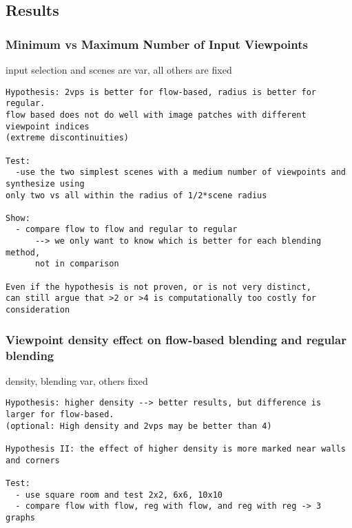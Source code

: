 \subsection{Results}
\subsubsection{Minimum vs Maximum Number of Input Viewpoints}
input selection and scenes are var, all others are fixed
\begin{verbatim}
Hypothesis: 2vps is better for flow-based, radius is better for regular.
flow based does not do well with image patches with different viewpoint indices
(extreme discontinuities)

Test: 
  -use the two simplest scenes with a medium number of viewpoints and synthesize using
only two vs all within the radius of 1/2*scene radius

Show: 
  - compare flow to flow and regular to regular
      --> we only want to know which is better for each blending method,
      not in comparison

Even if the hypothesis is not proven, or is not very distinct,
can still argue that >2 or >4 is computationally too costly for consideration

\end{verbatim}

\subsubsection{Viewpoint density effect on flow-based blending and regular blending}
density, blending var, others fixed
\begin{verbatim}
Hypothesis: higher density --> better results, but difference is larger for flow-based.
(optional: High density and 2vps may be better than 4)

Hypothesis II: the effect of higher density is more marked near walls and corners

Test:
  - use square room and test 2x2, 6x6, 10x10
  - compare flow with flow, reg with flow, and reg with reg -> 3 graphs

\end{verbatim}

